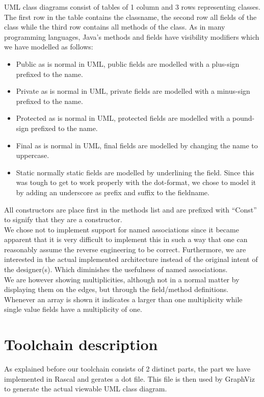 \documentclass[a4paper,twoside,11pt]{article}
\begin{document}
UML class diagrams consist of tables of 1 column and 3 rows representing classes. The first row in the table contains the classname, the second row all fields of the class while the third row contains all methods of the class. As in many programming languages, Java's methods and fields have visibility modifiers which we have modelled as follows:

\begin{itemize}
\item {\sc Public} as is normal in UML, public fields are modelled with a plus-sign prefixed to the name. 
\item {\sc Private} as is normal in UML, private fields are modelled with a minus-sign prefixed to the name.
\item {\sc Protected} as is normal in UML, protected fields are modelled with a pound-sign prefixed to the name.
\item {\sc Final} as is normal in UML, final fields are modelled by changing the name to uppercase.
\item {\sc Static} normally static fields are modelled by underlining the field. Since this was tough to get to work properly with the dot-format, we chose to model it by adding an underscore as prefix and suffix to the fieldname.
\end{itemize}

All constructors are place first in the methods list and are prefixed with ``Const'' to signify that they are a constructor. \\

We chose not to implement support for named associations since it became apparent that it is very difficult to implement this in such a way that one can reasonably assume the reverse engineering to be correct. Furthermore, we are interested in the actual implemented architecture instead of the original intent of the designer(s). Which diminishes the usefulness of named associations.\\

We are however showing multiplicities, although not in a normal matter by displaying them on the edges, but through the field/method definitions. Whenever an array is shown it indicates a larger than one multiplicity while single value fields have a multiplicity of one. \\

\section{Toolchain description}
\label{sec:tooldescription}
As explained before our toolchain consists of 2 distinct parts, the part we have implemented in Rascal and gerates a dot file. This file is then used by GraphViz\cite{url:graphviz} to generate the actual viewable UML class diagram. \\
\end{document}
